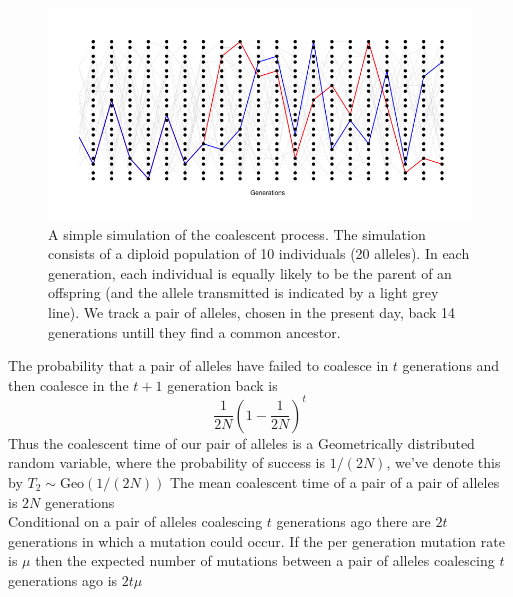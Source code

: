 \begin{figure}
\begin{center}
\includegraphics[width=\textwidth]{figures/Coalescent.png}
\end{center}
\caption{A simple simulation of the coalescent process. The simulation
  consists of a diploid population of 10 individuals (20 alleles). In
  each generation, each individual is equally likely to be the parent
  of an offspring (and the allele transmitted is indicated by a light
  grey line).  We track a
  pair of alleles, chosen in the present day, back 14 generations
  untill they find a common ancestor.} \label{fig:Coalescent_simulation}
\end{figure}

The probability that a pair of alleles
have failed to coalesce in $t$ generations and then coalesce in the
$t+1$ generation back is
\begin{equation}
  \frac{1}{2N} \left(1- \frac{1}{2N} \right)^{t} \label{eqn:coal_time_dist}
\end{equation}
Thus the coalescent time of our pair of alleles is a Geometrically distributed random variable,
where the probability of success is $1/(2N)$, we've denote this by $T_2 \sim  \text{Geo}(1/(2N))$
The mean coalescent time of a pair of a pair of alleles is $2N$ generations\\


Conditional on a pair of alleles coalescing $t$ generations ago
there are $2t$ generations in which a mutation could occur. If the per
generation mutation rate is $\mu$ then the expected number of
mutations between a pair of alleles coalescing $t$ generations ago is
$2 t\mu$


